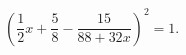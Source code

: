 \begin{ex}[type=equation]
	\begin{condition}
		$\left(\dfrac{1}{2}x + \dfrac{5}{8}-\dfrac{15}{88 + 32x}\right)^2 = 1.$
	\end{condition}
\end{ex}
